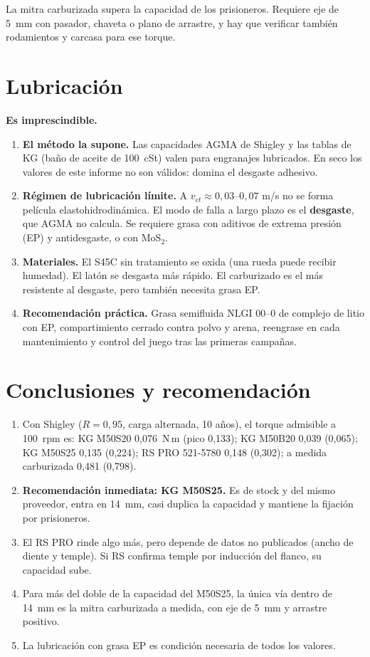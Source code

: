 \documentclass[11pt,a4paper]{article}
\begin{document}
La mitra carburizada supera la capacidad de los prisioneros. Requiere eje de 5~mm con pasador, chaveta o plano de arrastre, y hay que
verificar también rodamientos y carcasa para ese torque.

\section{Lubricación}\label{sec:lub}
\textbf{Es imprescindible.}
\begin{enumerate}[leftmargin=1.2em]
\item \textbf{El método la supone.} Las capacidades AGMA de Shigley y las tablas de KG (baño de aceite de 100~cSt) valen para engranajes lubricados.
En seco los valores de este informe no son válidos: domina el desgaste adhesivo.
\item \textbf{Régimen de lubricación límite.} A $v_{et}\approx0{,}03$--$0{,}07$ m/s no se forma película elastohidrodinámica. El modo de falla a largo plazo es
el \textbf{desgaste}, que AGMA no calcula. Se requiere grasa con aditivos de extrema presión (EP) y antidesgaste, o con MoS$_2$.
\item \textbf{Materiales.} El S45C sin tratamiento se oxida (una rueda puede recibir humedad). El latón se desgasta más rápido. El carburizado es
el más resistente al desgaste, pero también necesita grasa EP.
\item \textbf{Recomendación práctica.} Grasa semifluida NLGI 00--0 de complejo de litio con EP, compartimiento cerrado contra polvo y arena,
reengrase en cada mantenimiento y control del juego tras las primeras campañas.
\end{enumerate}

\section{Conclusiones y recomendación}
\begin{enumerate}[leftmargin=1.2em]
\item Con Shigley ($R=0{,}95$, carga alternada, 10 años), el torque admisible a 100~rpm es:
KG M50S20 0,076~N\,m (pico 0,133);
KG M50B20 0,039 (0,065);
KG M50S25 0,135 (0,224);
RS PRO 521-5780 0,148 (0,302);
a medida carburizada 0,481 (0,798).
\item \textbf{Recomendación inmediata: KG M50S25.} Es de stock y del mismo proveedor, entra en 14~mm, casi duplica la capacidad y mantiene la fijación por prisioneros.
\item El RS PRO rinde algo más, pero depende de datos no publicados (ancho de diente y temple). Si RS confirma temple por inducción del flanco, su capacidad sube.
\item Para más del doble de la capacidad del M50S25, la única vía dentro de 14~mm es la mitra carburizada a medida, con eje de 5~mm y arrastre positivo.
\item La lubricación con grasa EP es condición necesaria de todos los valores.
\end{enumerate}
\end{document}
